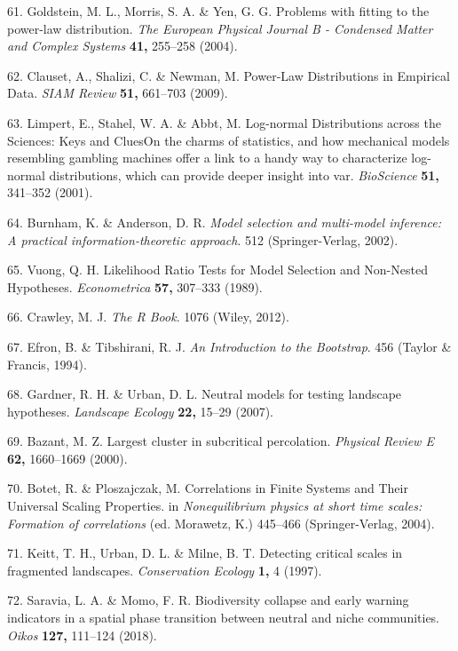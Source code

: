 \documentclass[]{article}
\begin{document}
\hypertarget{ref-Goldstein2004}{}
61. Goldstein, M. L., Morris, S. A. \& Yen, G. G. Problems with fitting
to the power-law distribution. \emph{The European Physical Journal B -
Condensed Matter and Complex Systems} \textbf{41,} 255--258 (2004).

\hypertarget{ref-Clauset2009}{}
62. Clauset, A., Shalizi, C. \& Newman, M. Power-Law Distributions in
Empirical Data. \emph{SIAM Review} \textbf{51,} 661--703 (2009).

\hypertarget{ref-Limpert2001}{}
63. Limpert, E., Stahel, W. A. \& Abbt, M. Log-normal Distributions
across the Sciences: Keys and CluesOn the charms of statistics, and how
mechanical models resembling gambling machines offer a link to a handy
way to characterize log-normal distributions, which can provide deeper
insight into var. \emph{BioScience} \textbf{51,} 341--352 (2001).

\hypertarget{ref-Burnham2002}{}
64. Burnham, K. \& Anderson, D. R. \emph{Model selection and multi-model
inference: A practical information-theoretic approach}. 512
(Springer-Verlag, 2002).

\hypertarget{ref-Vuong1989}{}
65. Vuong, Q. H. Likelihood Ratio Tests for Model Selection and
Non-Nested Hypotheses. \emph{Econometrica} \textbf{57,} 307--333 (1989).

\hypertarget{ref-Crawley2012}{}
66. Crawley, M. J. \emph{The R Book}. 1076 (Wiley, 2012).

\hypertarget{ref-Efron1994}{}
67. Efron, B. \& Tibshirani, R. J. \emph{An Introduction to the
Bootstrap}. 456 (Taylor \& Francis, 1994).

\hypertarget{ref-Gardner2007}{}
68. Gardner, R. H. \& Urban, D. L. Neutral models for testing landscape
hypotheses. \emph{Landscape Ecology} \textbf{22,} 15--29 (2007).

\hypertarget{ref-Bazant2000}{}
69. Bazant, M. Z. Largest cluster in subcritical percolation.
\emph{Physical Review E} \textbf{62,} 1660--1669 (2000).

\hypertarget{ref-Botet2004}{}
70. Botet, R. \& Ploszajczak, M. Correlations in Finite Systems and
Their Universal Scaling Properties. in \emph{Nonequilibrium physics at
short time scales: Formation of correlations} (ed. Morawetz, K.)
445--466 (Springer-Verlag, 2004).

\hypertarget{ref-Keitt1997}{}
71. Keitt, T. H., Urban, D. L. \& Milne, B. T. Detecting critical scales
in fragmented landscapes. \emph{Conservation Ecology} \textbf{1,} 4
(1997).

\hypertarget{ref-Saravia2018}{}
72. Saravia, L. A. \& Momo, F. R. Biodiversity collapse and early
warning indicators in a spatial phase transition between neutral and
niche communities. \emph{Oikos} \textbf{127,} 111--124 (2018).
\end{document}
